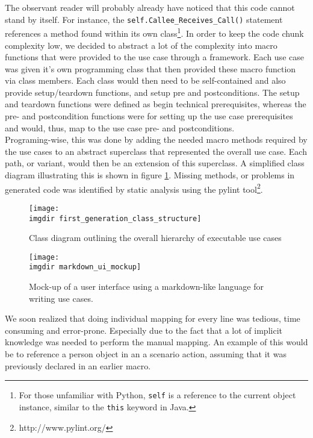 \noindent
The observant reader will probably already have noticed that this code cannot stand by itself. For instance, the \texttt{self.Callee\_Receives\_Call()} statement references a method found within its own class\footnote{For those unfamiliar with Python, \texttt{self} is a reference to the current object instance, similar to the \texttt{this} keyword in Java.}. In order to keep the code chunk complexity low, we decided to abstract a lot of the complexity into macro functions that were provided to the use case through a framework. Each use case was given it's own programming class that then provided these macro function via class members. Each class would then need to be self-contained and also provide setup/teardown functions, and setup pre and postconditions. The setup and teardown functions were defined as begin technical prerequisites, whereas the pre- and postcondition functions were for setting up the use case prerequisites and would, thus, map to the use case pre- and postconditions.\\

Programing-wise, this was done by adding the needed macro methods required by the use cases to an abstract superclass that represented the overall use case. Each path, or variant, would then be an extension of this superclass. A simplified class diagram illustrating this is shown in figure \ref{fig:first_generation_class_structure}. Missing methods, or problems in generated code was identified by static analysis using the pylint tool\footnote{http://www.pylint.org/}.


\begin{figure}
\centering
\texttt{[image: \\imgdir first\_generation\_class\_structure]}
\caption{Class diagram outlining the overall hierarchy of executable use cases}
\label{fig:first_generation_class_structure}
\end{figure}

\begin{figure}
\centering
\texttt{[image: \\imgdir markdown\_ui\_mockup]}
\caption{Mock-up of a user interface using a markdown-like language for writing use cases.}
\label{fig:markdown_ui_mockup}
\end{figure}

We soon realized that doing individual mapping for every line was tedious, time consuming and error-prone. Especially due to the fact that a lot of implicit knowledge was needed to perform the manual mapping. An example of this would be to reference a person object in an a scenario action, assuming that it was previously declared in an earlier macro.


